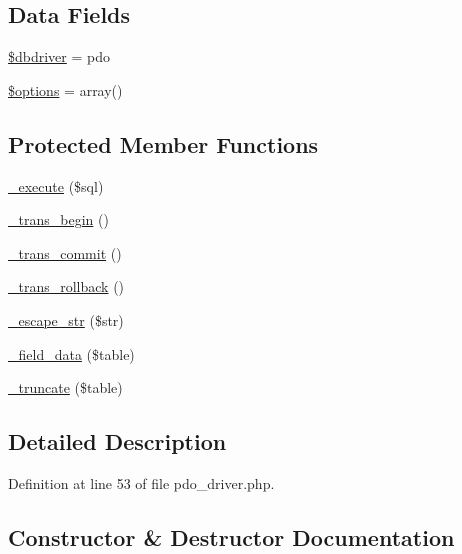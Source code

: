 \subsection*{Data Fields}
\begin{DoxyCompactItemize}
\item 
\mbox{\hyperlink{class_c_i___d_b__pdo__driver_a0cde2a16322a023d040aa7f725877597}{\$dbdriver}} = \textquotesingle{}pdo\textquotesingle{}
\item 
\mbox{\hyperlink{class_c_i___d_b__pdo__driver_a011800c63ece4cbbfa77136a20607023}{\$options}} = array()
\end{DoxyCompactItemize}
\subsection*{Protected Member Functions}
\begin{DoxyCompactItemize}
\item 
\mbox{\hyperlink{class_c_i___d_b__pdo__driver_a114ab675d89bf8324a41785fb475e86d}{\+\_\+execute}} (\$sql)
\item 
\mbox{\hyperlink{class_c_i___d_b__pdo__driver_ac81ac882c1d54347d810199a15856aac}{\+\_\+trans\+\_\+begin}} ()
\item 
\mbox{\hyperlink{class_c_i___d_b__pdo__driver_a6fe7f373e0b11cfae23a5f41c0b35dda}{\+\_\+trans\+\_\+commit}} ()
\item 
\mbox{\hyperlink{class_c_i___d_b__pdo__driver_ad49a116b0776c26b53114c9093fd102a}{\+\_\+trans\+\_\+rollback}} ()
\item 
\mbox{\hyperlink{class_c_i___d_b__pdo__driver_af8ef0237bfcdb19215b63fff769e7a55}{\+\_\+escape\+\_\+str}} (\$str)
\item 
\mbox{\hyperlink{class_c_i___d_b__pdo__driver_a95247d9671893adc3444cb184ad32ea1}{\+\_\+field\+\_\+data}} (\$table)
\item 
\mbox{\hyperlink{class_c_i___d_b__pdo__driver_aa029600528fc1ce660a23ff4b4667f95}{\+\_\+truncate}} (\$table)
\end{DoxyCompactItemize}


\subsection{Detailed Description}


Definition at line 53 of file pdo\+\_\+driver.\+php.



\subsection{Constructor \& Destructor Documentation}
\mbox{\label{class_c_i___d_b__pdo__driver_a9162320adff1a1a4afd7f2372f753a3e}} 
